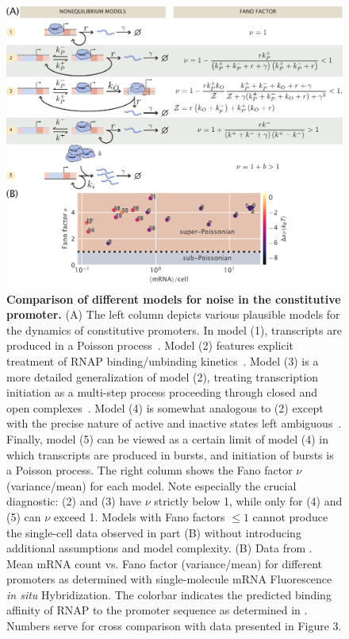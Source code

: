 \begin{figure}%
\centering
\includegraphics[width=\textwidth]{../../figures/main/fig02.pdf}
\caption{\textbf{Comparison of different models for noise in the constitutive promoter.}
(A) The left column depicts various plausible models for the dynamics of
constitutive promoters. In model (1), transcripts are produced in a Poisson
process~\cite{Sanchez2013, Jones2014}. Model (2) features explicit treatment of
RNAP binding/unbinding kinetics~\cite{Phillips2015a}. Model (3) is a more
detailed generalization of model (2), treating transcription initiation as a
multi-step process proceeding through closed and open
complexes~\cite{Mitarai2015}. Model (4) is somewhat analogous to (2) except with
the precise nature of active and inactive states left
ambiguous~\cite{Peccoud1995, Shahrezaei2008, Razo-Mejia2020}. Finally, model (5)
can be viewed as a certain limit of model (4) in which transcripts are produced
in bursts, and initiation of bursts is a Poisson process. The right column shows
the Fano factor $\nu$ (variance/mean) for each model. Note especially the
crucial diagnostic: (2) and (3) have $\nu$ strictly below 1, while only for (4)
and (5) can $\nu$ exceed 1. Models with Fano factors $\le 1$ cannot produce the
single-cell data observed in part (B) without introducing additional assumptions
and model complexity. (B) Data from \cite{Jones2014}. Mean mRNA count vs. Fano
factor (variance/mean) for different promoters as determined with
single-molecule mRNA Fluorescence \textit{in situ} Hybridization. The colorbar
indicates the predicted binding affinity of RNAP to the promoter sequence as
determined in \cite{Brewster2012}. Numbers serve for cross comparison with data
presented in Figure 3.}
\label{fig2:constit_cartoons}
\end{figure}


